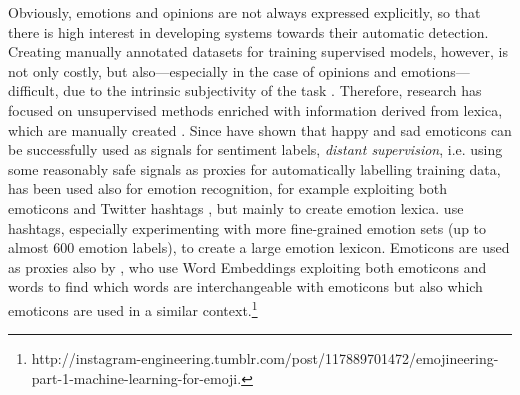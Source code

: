 \documentclass[11pt]{article}
\begin{document}
Obviously, emotions and opinions are not always expressed explicitly, so that there is high interest in developing systems towards their automatic detection. Creating manually annotated datasets for training supervised models, however, is not only costly, but also---especially in the case of opinions and emotions---difficult, due to the intrinsic subjectivity of the task \cite{strapparava2008learning,kim2010evaluation}. Therefore, research has focused on unsupervised methods enriched with information derived from lexica, which are manually created \cite{chaffar2011using,kim2010evaluation}. Since  have shown that happy and sad emoticons can be successfully used as signals for sentiment labels, \textit{distant supervision}, i.e.  using some reasonably safe signals as proxies for automatically labelling training data, has been used also for emotion recognition, for example exploiting both emoticons and Twitter hashtags \cite{purver2012experimenting}, but mainly to create emotion lexica. use hashtags, especially experimenting with more fine-grained emotion sets (up to almost 600 emotion labels), to create a large emotion lexicon. Emoticons are used as proxies also by , who use Word Embeddings exploiting both emoticons and words to find which words are interchangeable with emoticons but also which emoticons are used in a similar context.\footnote{{http://instagram-engineering.tumblr.com/post/117889701472/emojineering-part-1-machine-learning-for-emoji}.}


%
%
%
%
\end{document}
